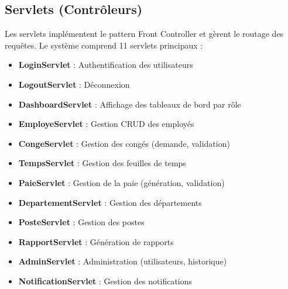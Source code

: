 \documentclass[12pt,a4paper,twoside]{report}
\begin{document}
\subsection{Servlets (Contrôleurs)}

Les servlets implémentent le pattern Front Controller et gèrent le routage des requêtes. Le système comprend 11 servlets principaux :

\begin{itemize}
    \item \textbf{LoginServlet} : Authentification des utilisateurs
    \item \textbf{LogoutServlet} : Déconnexion
    \item \textbf{DashboardServlet} : Affichage des tableaux de bord par rôle
    \item \textbf{EmployeServlet} : Gestion CRUD des employés
    \item \textbf{CongeServlet} : Gestion des congés (demande, validation)
    \item \textbf{TempsServlet} : Gestion des feuilles de temps
    \item \textbf{PaieServlet} : Gestion de la paie (génération, validation)
    \item \textbf{DepartementServlet} : Gestion des départements
    \item \textbf{PosteServlet} : Gestion des postes
    \item \textbf{RapportServlet} : Génération de rapports
    \item \textbf{AdminServlet} : Administration (utilisateurs, historique)
    \item \textbf{NotificationServlet} : Gestion des notifications
\end{itemize}
\end{document}
